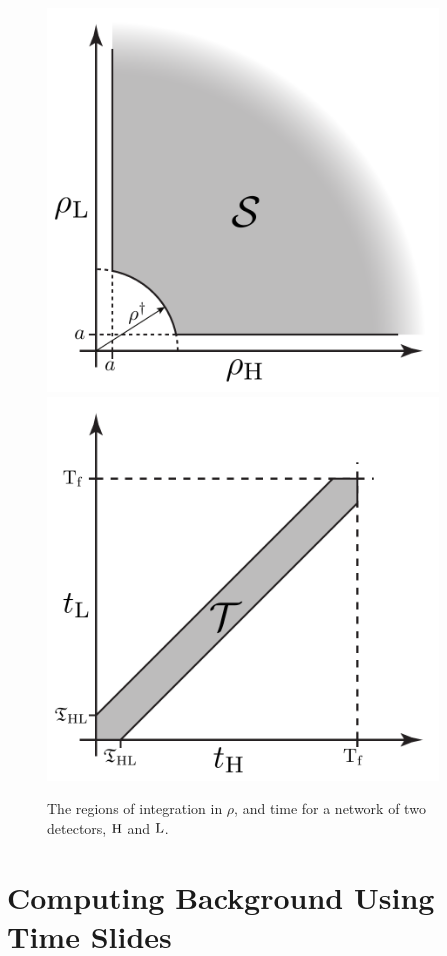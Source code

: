 \begin{figure}[p]
\center
\includegraphics[height=4in]{figures/SNRintegrationRegion.pdf} \\
\includegraphics[height=4in]{figures/TimeIntegrationRegion.pdf}
\caption{The regions of integration in $\rho$, and time for a network of two detectors, $\mathrm{H}$ and $\mathrm{L}$.}
\label{fig:snr_time_integral}
\end{figure}

\section{Computing Background Using Time Slides}
\label{sec:using_time_slides}

